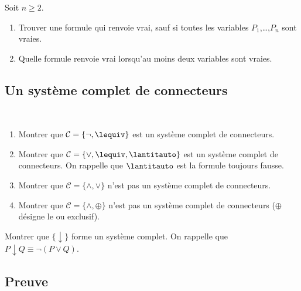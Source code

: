 \documentclass[11pt,class=report,crop=false]{standalone}
\begin{document}
\begin{exercicecours}
	Soit $n \ge 2$. 
	\begin{enumerate}
		\item Trouver une formule qui renvoie vrai, sauf si toutes les variables $P_1$,\ldots,$P_n$ sont vraies.
		
		\item Quelle formule renvoie vrai lorsqu'au moins deux variables sont vraies.
	\end{enumerate}	
\end{exercicecours}


\subsection*{Un système complet de connecteurs}

\begin{exercicecours}
	~
	\begin{enumerate}
		\item Montrer que $\mathcal{C} = \{ \lnot, \lequiv\}$ est un système complet de connecteurs.
		
		\item Montrer que $\mathcal{C} = \{ \lor, \lequiv,\lantitauto \}$ est un système complet de connecteurs. On rappelle que $\lantitauto$ est la formule toujours fausse.	
		
		\item Montrer que $\mathcal{C} = \{ \land, \lor\}$ n'est pas un système complet de connecteurs.
		
		\item Montrer que $\mathcal{C} = \{ \land, \oplus\}$ n'est pas un système complet de connecteurs ($\oplus$ désigne le ou exclusif).
	\end{enumerate}	
\end{exercicecours}

\begin{exercicecours}
	Montrer que $\{ \downarrow \}$ forme un système complet.
	On rappelle que $P \downarrow Q \equiv \lnot (P \lor Q)$.
\end{exercicecours}


\subsection*{Preuve}
\end{document}
